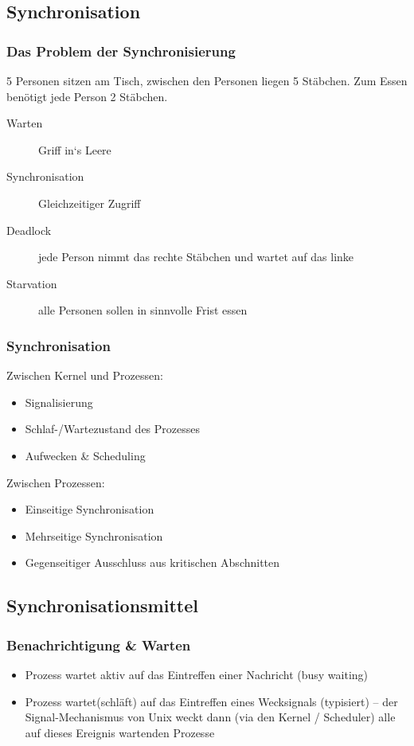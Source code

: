 \documentclass[a4paper, 10pt]{article}
\begin{document}
\subsection{Synchronisation}
\subsubsection{Das Problem der Synchronisierung}
5 Personen sitzen am Tisch, zwischen den Personen liegen 5 Stäbchen. Zum Essen benötigt jede Person 2 Stäbchen.
\begin{description}
	\item[Warten] Griff in‘s Leere
	\item[Synchronisation] Gleichzeitiger Zugriff
	\item[Deadlock] jede Person nimmt das rechte Stäbchen und wartet auf das linke
	\item[Starvation] alle Personen sollen in sinnvolle Frist essen
\end{description}

\subsubsection{Synchronisation}
Zwischen Kernel und Prozessen:
\begin{itemize}
	\item Signalisierung	
	\item Schlaf-/Wartezustand des Prozesses
	\item Aufwecken \& Scheduling
\end{itemize}
Zwischen Prozessen:
\begin{itemize}
	\item Einseitige Synchronisation
	\item Mehrseitige Synchronisation
	\item Gegenseitiger Ausschluss aus kritischen Abschnitten
\end{itemize}

\subsection{Synchronisationsmittel}

\subsubsection{Benachrichtigung \& Warten}
\begin{itemize}
	\item Prozess wartet aktiv auf das Eintreffen einer Nachricht (busy waiting)
	\item Prozess wartet(schläft) auf das Eintreffen eines Wecksignals (typisiert) – der Signal-Mechanismus von Unix weckt dann (via den Kernel / Scheduler) alle auf dieses Ereignis wartenden Prozesse
\end{itemize}
\end{document}

